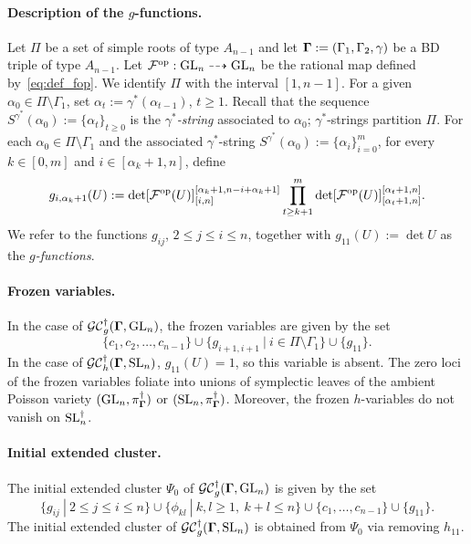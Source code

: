 \paragraph{Description of the $g$-functions.} Let $\Pi$ be a set of simple roots of type $A_{n-1}$ and let $\mathbf{\Gamma}:=(\Gamma_1,\Gamma_2,\gamma)$ be a BD triple of type $A_{n-1}$. Let $\mathcal{F}^{\mathrm{op}}:\operatorname{GL}_n \dashrightarrow \operatorname{GL}_n$ be the rational map defined by~\eqref{eq:def_fop}. We identify $\Pi$ with the interval $[1,n-1]$. For a given $\alpha_0 \in \Pi \setminus \Gamma_1$, set $\alpha_t:=\gamma^*(\alpha_{t-1})$, $t \geq 1$. Recall that the sequence $S^{\gamma^*}(\alpha_0):=\{\alpha_{t}\}_{t \geq 0}$ is the \emph{$\gamma^*$-string} associated to $\alpha_0$; $\gamma^*$-strings partition $\Pi$. For each $\alpha_0 \in \Pi\setminus\Gamma_1$ and the associated $\gamma^*$-string $S^{\gamma^*}(\alpha_0):= \{\alpha_i\}_{i=0}^m$, for every $k \in [0,m]$ and $i \in [\alpha_k+1,n]$, define
\begin{equation}\label{eq:g_fun}
    g_{i,\alpha_k+1}(U) := \det [\mathcal{F}^{\mathrm{op}}(U)]_{[i,n]}^{[\alpha_k+1,n-i+\alpha_k+1]} \prod_{t \geq k+1}^{m} \det[\mathcal{F}^{\mathrm{op}}(U)]_{[\alpha_t+1,n]}^{[\alpha_t+1,n]}.
\end{equation}
We refer to the functions $g_{ij}$, $2 \leq j \leq i \leq n$, together with $g_{11}(U):=\det U$ as the \emph{$g$-functions}. 

\paragraph{Frozen variables.} In the case of $\mathcal{GC}_g^{\dagger}(\mathbf{\Gamma},\operatorname{GL}_n)$, the frozen variables are given by the set
\begin{equation}
\{c_1,c_2,\ldots,c_{n-1}\} \cup \{g_{i+1,i+1} \ | \ i \in \Pi \setminus \Gamma_1\} \cup \{g_{11}\}.
\end{equation}
In the case of $\mathcal{GC}_h^{\dagger}(\mathbf{\Gamma},\operatorname{SL}_n)$, $g_{11}(U) = 1$, so this variable is absent. The zero loci of the frozen variables foliate into unions of symplectic leaves of the ambient Poisson variety $(\operatorname{GL}_n,\pi_{\mathbf{\Gamma}}^{\dagger})$ or $(\operatorname{SL}_n,\pi_{\mathbf{\Gamma}}^{\dagger})$. Moreover, the frozen $h$-variables do not vanish on $\operatorname{SL}_n^{\dagger}$.

\paragraph{Initial extended cluster.} The initial extended cluster $\Psi_0$ of $\mathcal{GC}_g^{\dagger}(\mathbf{\Gamma},\operatorname{GL}_n)$ is given by the set
\begin{equation}\label{eq:iniext}
    \{g_{ij} \ | \ 2 \leq j \leq i \leq n\} \cup \{\phi_{kl} \ | \ k,l \geq 1, \ k+l\leq n\} \cup \{c_1,\ldots,c_{n-1}\}\cup\{g_{11}\}.
\end{equation}
The initial extended cluster of $\mathcal{GC}_g^{\dagger}(\mathbf{\Gamma},\operatorname{SL}_n)$ is obtained from $\Psi_0$ via removing $h_{11}$.

